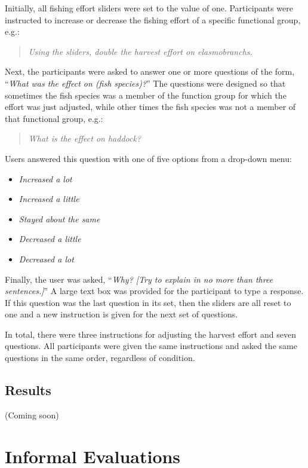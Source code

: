 Initially, all fishing effort sliders were set to the value of one.  Participants were  instructed to increase or decrease the fishing effort of a specific functional group, e.g.:
\begin{quote}
\textit{Using the sliders, double the harvest effort on elasmobranchs.}
\end{quote}

Next, the participants were asked to answer one or more questions of the form, ``\textit{What was the effect on (fish species)?}''  The questions were designed so that sometimes the fish species was a member of the function group for which the effort was just adjusted, while other times the fish species was not a member of that functional group, e.g.:
\begin{quote}
\textit{What is the effect on haddock?}
\end{quote}
Users answered this question with one of five options from a drop-down menu:
\begin{itemize}
\item \textit{Increased a lot}
\item \textit{Increased a little}
\item \textit{Stayed about the same}
\item \textit{Decreased a little}
\item \textit{Decreased a lot}
\end{itemize}

Finally, the user was asked, ``\textit{Why? [Try to explain in no more than three sentences.]}''  A large text box was provided for the participant to type a response.  If this question was the last question in its set, then the sliders are all reset to one and a new instruction is given for the next set of questions. 

In total, there were three instructions for adjusting the harvest effort and seven questions.  All participants were given the same instructions and asked the same questions in the same order, regardless of condition.

\subsection{Results}

(Coming soon)

\section{Informal Evaluations}

